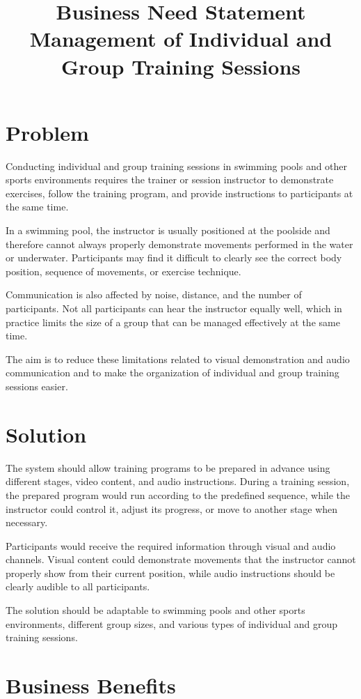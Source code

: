 \documentclass[a4paper,11pt]{article}
\title{Business Need Statement\\\large Management of Individual and Group Training Sessions}
\begin{document}
\maketitle

\section{Problem}
Conducting individual and group training sessions in swimming pools and other sports environments requires the trainer or session instructor to demonstrate exercises, follow the training program, and provide instructions to participants at the same time.

In a swimming pool, the instructor is usually positioned at the poolside and therefore cannot always properly demonstrate movements performed in the water or underwater. Participants may find it difficult to clearly see the correct body position, sequence of movements, or exercise technique.

Communication is also affected by noise, distance, and the number of participants. Not all participants can hear the instructor equally well, which in practice limits the size of a group that can be managed effectively at the same time.

The aim is to reduce these limitations related to visual demonstration and audio communication and to make the organization of individual and group training sessions easier.

\section{Solution}
The system should allow training programs to be prepared in advance using different stages, video content, and audio instructions. During a training session, the prepared program would run according to the predefined sequence, while the instructor could control it, adjust its progress, or move to another stage when necessary.

Participants would receive the required information through visual and audio channels. Visual content could demonstrate movements that the instructor cannot properly show from their current position, while audio instructions should be clearly audible to all participants.

The solution should be adaptable to swimming pools and other sports environments, different group sizes, and various types of individual and group training sessions.

\section{Business Benefits}
\end{document}
